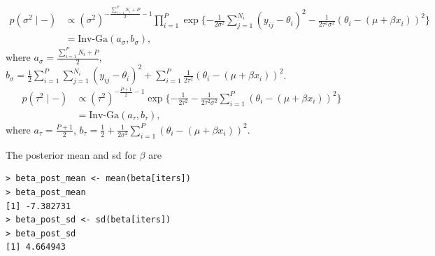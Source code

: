 \documentclass[11pt]{article}
\newcommand{\half}{\frac{1}{2}}
\begin{document}
\begin{enumerate}[(A)]
\begin{align*}
    p(\sigma^2 \mid -) &\propto (\sigma^2)^{-\frac{\sum_{i=1}^P N_i + P}{2} - 1} \prod_{i=1}^P \exp\{ -\frac{1}{2\sigma^2} \sum_{j=1}^{N_i} (y_{ij} - \theta_i)^2 - \frac{1}{2\tau^2 \sigma^2} (\theta_i -(\mu +\beta x_i))^2 \} \\
    &= \text{Inv-Ga}(a_\sigma, b_\sigma),
\end{align*}
where $a_\sigma = \frac{\sum_{i=1}^P N_i + P}{2}$, $b_\sigma = \half \sum_{i=1}^P \sum_{j=1}^{N_i} (y_{ij} - \theta_i)^2 + \sum_{i=1}^P \frac{1}{2\tau^2} (\theta_i -(\mu+\beta x_i))^2$.
\begin{align*}
    p(\tau^2 \mid -) &\propto (\tau^2)^{-\frac{P+1}{2} - 1} \exp\{ -\frac{1}{2\tau^2} - \frac{1}{2\tau^2 \sigma^2} \sum_{i=1}^P (\theta_i -(\mu+\beta x_i))^2\} \\
    &= \text{Inv-Ga} (a_\tau, b_\tau),
\end{align*}
where $a_\tau = \frac{P+1}{2}$, $b_\tau = \half + \frac{1}{2 \sigma^2} \sum_{i=1}^P (\theta_i -(\mu+\beta x_i))^2$.

The posterior mean and sd for $\beta$ are
\begin{lstlisting}
> beta_post_mean <- mean(beta[iters])
> beta_post_mean
[1] -7.382731
> beta_post_sd <- sd(beta[iters])
> beta_post_sd
[1] 4.664943
\end{lstlisting}


\end{enumerate}
\end{document}
